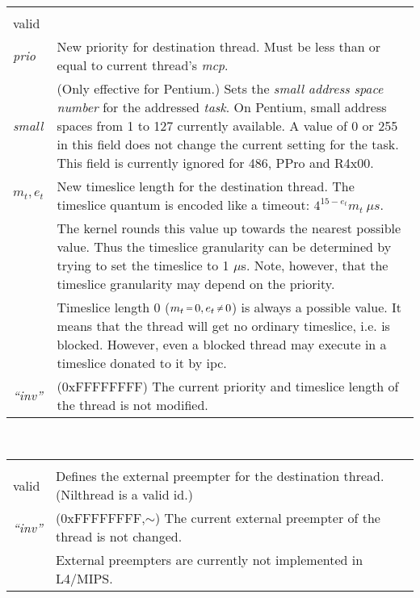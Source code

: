 \documentclass[a4paper,11pt,twoside,dvips]{book}
\makeatletter
\newcommand{\micro}{$\mu$}
\newcommand{\smaller}[1]{{\mathchoice 
           {\raisebox{1pt}{$\scriptstyle #1$}} 
           {\raisebox{1pt}{$\scriptstyle #1$}} 
           {\raisebox{0.5pt}{$\scriptscriptstyle #1$}} 
           {\raisebox{0.5pt}{$\scriptscriptstyle #1$}} 
}}
\newcommand{\EQ}{\smaller{=}}
\newcommand{\NE}{\smaller{\neq}}
\newcommand{\undef}{$\sim$}
\newlength{\Up}\setlength{\Up}{-\baselineskip}
\newlength{\Params}
\newenvironment{param}[1] 
{%
\setlength{\Params}{\textwidth}\addtolength{\Params}{-140pt}%
\par\vspace{5pt}%
\noindent\begin{minipage}{\textwidth} 
\noindent {\em #1}\\[\Up]%
\noindent\begin{tabular}{@{\hspace*{75pt}}lp{\Params}}%
\hspace*{30pt}&\\[\Up]%
} 
{%
\end{tabular}\end{minipage}\par\vspace{5pt}%
}
\newlength{\bboxw}
\newcommand{\impnote}[1]{\framebox{\textbf{MIPS Implementation Note:}} #1}
\newcommand{\bbox}[2]{\setlength{\bboxw}{#2pt}\addtolength{\bboxw}{\bboxw}%
\addtolength{\bboxw}{\bboxw}\addtolength{\bboxw}{\bboxw}%
\framebox[\bboxw]{{\footnotesize #1$_{\ (#2)}$\rule[-1ex]{0pt}{4ex}}}}
\makeatother
\begin{document}
\begin{param}{param word} 
            valid    & 
                     \bbox{$m_t$}{8}\bbox{$e_t$}{4}\bbox{0}{4}\bbox{small}{8}\bbox{prio}{8}\\[12pt] 
         {\em prio}  &     New priority for destination thread. Must be less
                           than or equal to current thread's {\em
                           mcp}.\\[5pt] 
% 
         {\em small} &     (Only effective for Pentium.) Sets the {\em small address space number}
                           for the addressed {\em task}. On Pentium, small address spaces from 1 
                           to 127 currently available. A value of 0 or 255 in this field does
                           not change the current setting for the task. This field is currently
                           ignored for 486, PPro \cbstart and R4x00\cbend.\\[5pt]
%
              $m_t,e_t$&   New timeslice length for the destination thread.
                           The timeslice quantum is encoded like a timeout:
                           $4^{15-e_t}m_t\ \mu s$.\\ 
                       &   The kernel rounds this
                           value up towards the nearest possible value. Thus
                           the timeslice granularity can be determined by
                           trying to set the timeslice to 1 \micro s. Note,
                           however, that the timeslice granularity may depend on
                           the priority.\\ 
                       &   Timeslice length 0 ($m_t\,\EQ\,0 ,
                           e_t\,\NE\,0$) is always a possible value. It
                           means that the thread will get no ordinary
                           timeslice, i.e. is blocked.
                           However, even a blocked thread may execute in a
                           timeslice donated to it by ipc.\\[8pt] 
%
       {\em ``inv''}   &   (0xFFFFFFFF) The current priority and timeslice
                           length of the thread is not modified. 
\end{param} 
 
 
\begin{param}{ext preempter} 
% 
           valid       &   Defines the external preempter for the
                           destination thread. (Nilthread is a valid
                           id.)\\[5pt] 
%
       {\em ``inv''}   &   (0xFFFFFFFF,\undef) The current external
                           preempter of the thread is not changed. \\[5pt] 
%
		       &   \cbstart\impnote{External preempters are
		       	   currently not implemented in L4/MIPS.}\cbend
\end{param}
 
\end{document}
